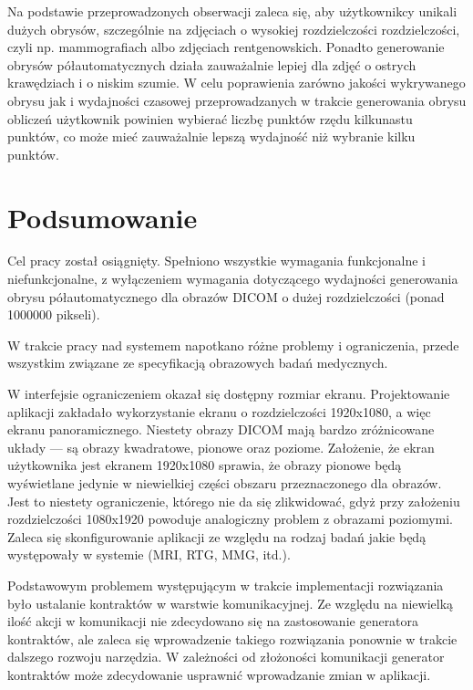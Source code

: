 \documentclass[a4paper,11pt,twoside,openright]{report}
\newcommand\blankpage{%
    \null
    \thispagestyle{empty}%
    \newpage}
\theoremstyle{definition}
\begin{document}
Na podstawie przeprowadzonych obserwacji zaleca się, aby użytkownikcy unikali
dużych obrysów, szczególnie na zdjęciach o wysokiej rozdzielczości rozdzielczości,
czyli np. mammografiach albo zdjęciach rentgenowskich. Ponadto generowanie obrysów
półautomatycznych działa zauważalnie lepiej dla zdjęć o ostrych krawędziach i o
niskim szumie. W celu poprawienia zarówno jakości wykrywanego obrysu jak i
wydajności czasowej przeprowadzanych w trakcie generowania obrysu obliczeń użytkownik
powinien wybierać liczbę punktów rzędu kilkunastu punktów, co może mieć zauważalnie
lepszą wydajność niż wybranie kilku punktów.

\afterpage{\blankpage}
\chapter {Podsumowanie}


Cel pracy został osiągnięty. Spełniono wszystkie wymagania funkcjonalne i niefunkcjonalne,
z wyłączeniem wymagania dotyczącego wydajności generowania obrysu półautomatycznego
dla obrazów DICOM o dużej rozdzielczości (ponad 1000000 pikseli).

W trakcie pracy nad systemem napotkano różne problemy i ograniczenia, przede wszystkim
związane ze specyfikacją obrazowych badań medycznych.

W interfejsie ograniczeniem okazał się dostępny rozmiar ekranu. Projektowanie
aplikacji zakładało wykorzystanie ekranu o rozdzielczości 1920x1080, a więc ekranu
panoramicznego. Niestety obrazy DICOM mają bardzo zróżnicowane układy --- są obrazy
kwadratowe, pionowe oraz poziome. Założenie, że ekran użytkownika jest ekranem
1920x1080 sprawia, że obrazy pionowe będą wyświetlane jedynie w niewielkiej
części obszaru przeznaczonego dla obrazów. Jest to niestety ograniczenie, którego
nie da się zlikwidować, gdyż przy założeniu rozdzielczości 1080x1920 powoduje
analogiczny problem z obrazami poziomymi. Zaleca się skonfigurowanie aplikacji
ze względu na rodzaj badań jakie będą występowały w systemie (MRI, RTG, MMG, itd.).


Podstawowym problemem występującym w trakcie implementacji rozwiązania było
ustalanie kontraktów w warstwie komunikacyjnej. Ze względu na niewielką ilość
akcji w komunikacji nie zdecydowano się na zastosowanie generatora kontraktów,
ale zaleca się wprowadzenie takiego rozwiązania ponownie w trakcie dalszego rozwoju narzędzia.
W zależności od złożoności komunikacji generator kontraktów może zdecydowanie
usprawnić wprowadzanie zmian w aplikacji.
\end{document}
